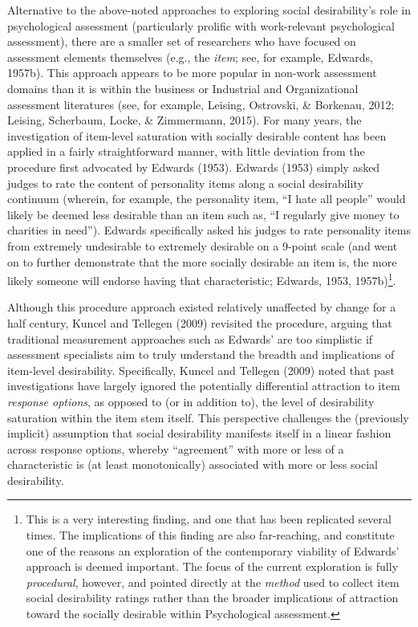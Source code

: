 \documentclass[
  english,
  ,jou]{apa6}
\begin{document}
Alternative to the above-noted approaches to exploring social desirability's role in psychological assessment (particularly prolific with work-relevant psychological assessment), there are a smaller set of researchers who have focused on assessment elements themselves (e.g., the \emph{item}; see, for example, Edwards, 1957b). This approach appears to be more popular in non-work assessment domains than it is within the business or Industrial and Organizational assessment literatures (see, for example, Leising, Ostrovski, \& Borkenau, 2012; Leising, Scherbaum, Locke, \& Zimmermann, 2015). For many years, the investigation of item-level saturation with socially desirable content has been applied in a fairly straightforward manner, with little deviation from the procedure first advocated by Edwards (1953). Edwards (1953) simply asked judges to rate the content of personality items along a social desirability continuum (wherein, for example, the personality item, \enquote{I hate all people} would likely be deemed less desirable than an item such as, \enquote{I regularly give money to charities in need}). Edwards specifically asked his judges to rate personality items from extremely undesirable to extremely desirable on a 9-point scale (and went on to further demonstrate that the more socially desirable an item is, the more likely someone will endorse having that characteristic; Edwards, 1953, 1957b)\footnote{This is a very interesting finding, and one that has been replicated several times. The implications of this finding are also far-reaching, and constitute one of the reasons an exploration of the contemporary viability of Edwards' approach is deemed important. The focus of the current exploration is fully \emph{procedural}, however, and pointed directly at the \emph{method} used to collect item social desirability ratings rather than the broader implications of attraction toward the socially desirable within Psychological assessment.}.

Although this procedure approach existed relatively unaffected by change for a half century, Kuncel and Tellegen (2009) revisited the procedure, arguing that traditional measurement approaches such as Edwards' are too simplistic if assessment specialists aim to truly understand the breadth and implications of item-level desirability. Specifically, Kuncel and Tellegen (2009) noted that past investigations have largely ignored the potentially differential attraction to item \emph{response options}, as opposed to (or in addition to), the level of desirability saturation within the item stem itself. This perspective challenges the (previously implicit) assumption that social desirability manifests itself in a linear fashion across response options, whereby \enquote{agreement} with more or less of a characteristic is (at least monotonically) associated with more or less social desirability.
\end{document}
